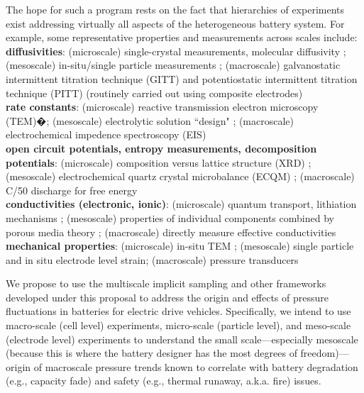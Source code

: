 \documentclass[11pt]{article}
\begin{document}
The hope for such a program rests on the fact that hierarchies of experiments exist addressing virtually all aspects 
of the heterogeneous battery system.  For example, some representative properties and measurements across scales include:\\
\textbf{diffusivities}: (microscale) single-crystal measurements, molecular diffusivity  \cite{Chung:2011}; (mesoscale) in-situ/single particle measurements \cite{Cui:2012};  (macroscale) galvanostatic intermittent titration technique (GITT) and potentiostatic intermittent titration technique (PITT) (routinely carried out using composite electrodes) \cite{Wen01121979}\\
\textbf{rate constants}: (microscale) reactive transmission electron microscopy (TEM)�\cite{Gu2012}; (mesoscale) electrolytic
solution ``design" \cite{Aurbach2004};  
(macroscale) electrochemical impedence spectroscopy (EIS) \cite{Meyers2000} \\
\textbf{open circuit potentials, entropy measurements, decomposition potentials}:  
(microscale) composition versus lattice structure (XRD) \cite{Ceder2009,Ohzuku1995};
(mesoscale) electrochemical quartz crystal microbalance (ECQM) \cite{Buttry1992};
(macroscale) C/50 discharge for free energy\\
\textbf{conductivities (electronic, ionic)}:  
(microscale) quantum transport, lithiation mechanisms \cite{Ceder2009};
(mesoscale) properties of individual components combined by porous media theory \cite{Stroud1975};
(macroscale) directly measure effective conductivities \\
\textbf{mechanical properties}: 
(microscale) in-situ TEM \cite{Wang:2012};
(mesoscale) single particle and in situ electrode level strain\cite{Qi:2010,Verbrugge:1999};
(macroscale) pressure transducers 

We propose to use the multiscale implicit sampling and other frameworks developed under this proposal to
address the origin and effects of pressure fluctuations in batteries for electric drive vehicles.  Specifically, we intend to
use macro-scale (cell level) experiments,
micro-scale (particle level), and meso-scale (electrode level) experiments to
understand the small scale---especially mesoscale (because this is where the
battery designer has the most degrees of freedom)---origin of macroscale
pressure trends known to correlate with battery degradation (e.g.,
capacity fade) and safety (e.g., thermal runaway, a.k.a. fire) issues.
\end{document}
